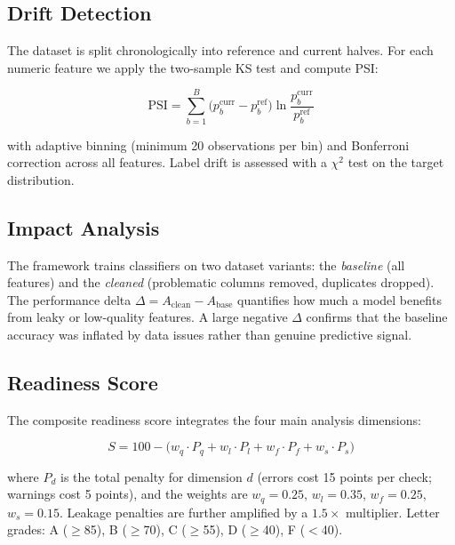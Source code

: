 \documentclass[11pt]{article}
\begin{document}
\subsection{Drift Detection}

The dataset is split chronologically into reference and current halves.  For
each numeric feature we apply the two-sample KS test and compute PSI:

\begin{equation}
  \text{PSI} = \sum_{b=1}^{B} \bigl( p_b^{\text{curr}} - p_b^{\text{ref}} \bigr)
               \ln \frac{p_b^{\text{curr}}}{p_b^{\text{ref}}}
\end{equation}

\noindent with adaptive binning (minimum 20 observations per bin) and
Bonferroni correction across all features.  Label drift is assessed with a
$\chi^2$ test on the target distribution.

\subsection{Impact Analysis}

The framework trains classifiers on two dataset variants: the \emph{baseline}
(all features) and the \emph{cleaned} (problematic columns removed, duplicates
dropped).  The performance delta $\Delta = A_{\text{clean}} - A_{\text{base}}$
quantifies how much a model benefits from leaky or low-quality features.  A
large negative $\Delta$ confirms that the baseline accuracy was inflated by
data issues rather than genuine predictive signal.

\subsection{Readiness Score}

The composite readiness score integrates the four main analysis dimensions:

\begin{equation}
  S = 100 - \bigl( w_q \cdot P_q + w_l \cdot P_l + w_f \cdot P_f + w_s \cdot P_s \bigr)
\end{equation}

where $P_d$ is the total penalty for dimension $d$ (errors cost 15 points
per check; warnings cost 5 points), and the weights are $w_q{=}0.25$,
$w_l{=}0.35$, $w_f{=}0.25$, $w_s{=}0.15$.  Leakage penalties are further
amplified by a $1.5\times$ multiplier.  Letter grades: A ($\ge$85), B
($\ge$70), C ($\ge$55), D ($\ge$40), F ($<$40).
\end{document}
